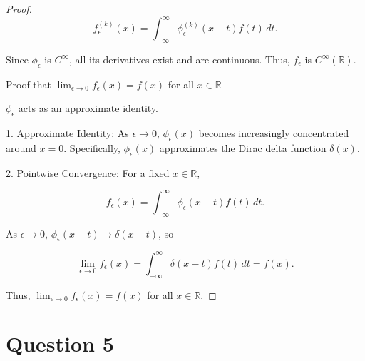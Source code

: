 \documentclass{article}
\begin{document}
\begin{proof}
\[
f_\epsilon^{(k)}(x) = \int_{-\infty}^{\infty} \phi_\epsilon^{(k)}(x - t) f(t) \, dt.
\]

Since \(\phi_\epsilon\) is \(C^{\infty}\), all its derivatives exist and are continuous. Thus, \(f_\epsilon\) is \(C^{\infty}(\mathbb{R})\).


Proof that \(\lim_{\epsilon \to 0} f_\epsilon(x) = f(x)\) for all \(x \in \mathbb{R}\)

\(\phi_\epsilon\) acts as an approximate identity.

1. Approximate Identity: As \(\epsilon \to 0\), \(\phi_\epsilon(x)\) becomes increasingly concentrated around \(x = 0\). Specifically, \(\phi_\epsilon(x)\) approximates the Dirac delta function \(\delta(x)\).

2. Pointwise Convergence: For a fixed \(x \in \mathbb{R}\),

\[
f_\epsilon(x) = \int_{-\infty}^{\infty} \phi_\epsilon(x - t) f(t) \, dt.
\]

As \(\epsilon \to 0\), \(\phi_\epsilon(x - t) \to \delta(x - t)\), so

\[
\lim_{\epsilon \to 0} f_\epsilon(x) = \int_{-\infty}^{\infty} \delta(x - t) f(t) \, dt = f(x).
\]

Thus, \( \lim_{\epsilon \to 0} f_\epsilon(x) = f(x) \) for all \( x \in \mathbb{R} \).

\end{proof}


\section{Question 5}
\end{document}
